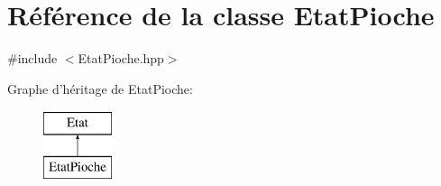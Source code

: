 \hypertarget{class_etat_pioche}{\section{Référence de la classe Etat\-Pioche}
\label{class_etat_pioche}
}


{\ttfamily \#include $<$Etat\-Pioche.\-hpp$>$}

Graphe d'héritage de Etat\-Pioche\-:\begin{figure}[H]
\begin{center}
\leavevmode
\includegraphics[height=2.000000cm]{class_etat_pioche}
\end{center}
\end{figure}

